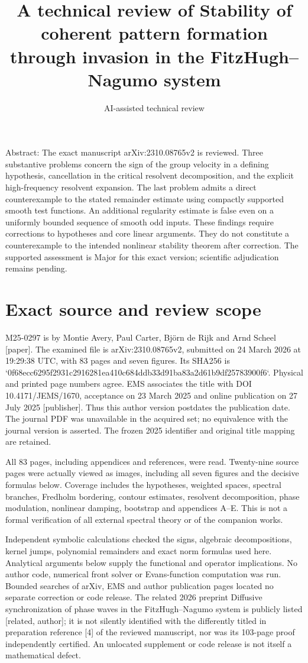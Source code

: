 \documentclass[10pt]{article}
\title{A technical review of
Stability of coherent pattern formation through invasion in the FitzHugh–Nagumo system}
\author{AI-assisted technical review}
\date{}
\begin{document}
\maketitle
Abstract: The exact manuscript arXiv:2310.08765v2 is reviewed. Three substantive problems concern the sign of the group velocity in a defining hypothesis, cancellation in the critical resolvent decomposition, and the explicit high-frequency resolvent expansion. The last problem admits a direct counterexample to the stated remainder estimate using compactly supported smooth test functions. An additional regularity estimate is false even on a uniformly bounded sequence of smooth odd inputs. These findings require corrections to hypotheses and core linear arguments. They do not constitute a counterexample to the intended nonlinear stability theorem after correction. The supported assessment is Major for this exact version; scientific adjudication remains pending.\par
\section*{Exact source and review scope}
M25-0297 is by Montie Avery, Paul Carter, Björn de Rijk and Arnd Scheel [paper]. The examined file is arXiv:2310.08765v2, submitted on 24 March 2026 at 19:29:38 UTC, with 83 pages and seven figures. Its SHA256 is `0f68ecc6295f2931c2916281ea410c684ddb33d91ba83a2d61b9df25783900f6`. Physical and printed page numbers agree. EMS associates the title with DOI 10.4171/JEMS/1670, acceptance on 23 March 2025 and online publication on 27 July 2025 [publisher]. Thus this author version postdates the publication date. The journal PDF was unavailable in the acquired set; no equivalence with the journal version is asserted. The frozen 2025 identifier and original title mapping are retained.\par
All 83 pages, including appendices and references, were read. Twenty-nine source pages were actually viewed as images, including all seven figures and the decisive formulas below. Coverage includes the hypotheses, weighted spaces, spectral branches, Fredholm bordering, contour estimates, resolvent decomposition, phase modulation, nonlinear damping, bootstrap and appendices A–E. This is not a formal verification of all external spectral theory or of the companion works.\par
Independent symbolic calculations checked the signs, algebraic decompositions, kernel jumps, polynomial remainders and exact norm formulas used here. Analytical arguments below supply the functional and operator implications. No author code, numerical front solver or Evans-function computation was run. Bounded searches of arXiv, EMS and author publication pages located no separate correction or code release. The related 2026 preprint Diffusive synchronization of phase waves in the FitzHugh–Nagumo system is publicly listed [related, author]; it is not silently identified with the differently titled in preparation reference [4] of the reviewed manuscript, nor was its 103-page proof independently certified. An unlocated supplement or code release is not itself a mathematical defect.\par
\end{document}
